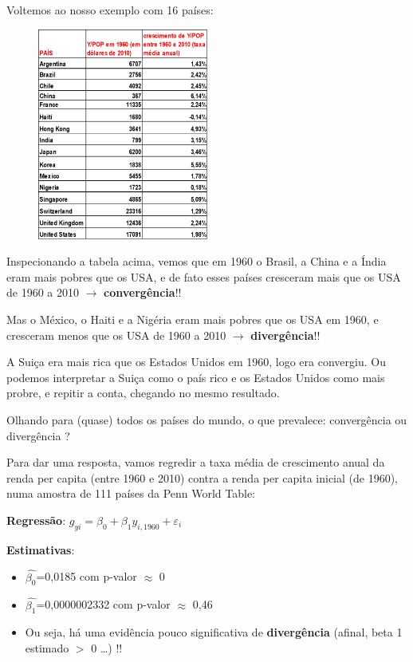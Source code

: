 \documentclass[a4paper,12pt]{article}[abntex2]
\begin{document}
Voltemos ao nosso exemplo com 16 países:
\begin{figure}[H]
        \centering
        \includegraphics[width=0.5\textwidth]{Imagens/a1i8.png}
\end{figure}

Inspecionando a tabela acima, vemos que em 1960 o Brasil, a China e a Índia eram mais pobres que os USA, e de fato esses países cresceram mais que os USA de 1960 a 2010 $\rightarrow$ \textbf{convergência}!!

Mas o México, o Haiti e a Nigéria eram mais pobres que os USA em 1960, e cresceram menos que os USA de 1960 a 2010  $\rightarrow$ \textbf{divergência}!!

A Suiça era mais rica que os Estados Unidos em 1960, logo era convergiu. Ou podemos interpretar a Suiça como o país rico e os Estados Unidos como mais probre, e repitir a conta, chegando no mesmo resultado. 

Olhando para (quase) todos os países do mundo, o que prevalece: convergência ou divergência ? 

Para dar uma resposta, vamos regredir a taxa média de crescimento anual da renda per capita (entre 1960 e 2010) contra a renda per capita inicial (de 1960), numa amostra de 111 países da Penn World Table:

\textbf{Regressão}:
$g_{yi}= \beta_0+\beta_1y_{i,1960}+\varepsilon_i$

\textbf{Estimativas}:\begin{itemize}
    \item $\hat{\beta_0}$=0,0185 com p-valor $\approx$ 0
    \item $\hat{\beta_1}$=0,0000002332 com p-valor $\approx$ 0,46
    \item Ou seja, há uma evidência pouco significativa de \textbf{divergência} (afinal, beta 1 estimado $>$ 0 …) !!
\end{itemize}
\end{document}
